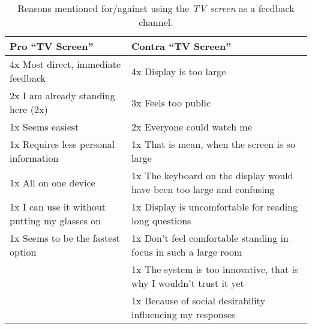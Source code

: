   \begin{table}[h]
    \small
    \center

    \begin{tabular}{p{7cm}p{7cm}}
    \toprule
    \textbf{Pro ``TV Screen''}  &  \textbf{Contra ``TV Screen''} \\ \midrule

    4x Most direct, immediate feedback  &  4x Display is too large  \\
    2x I am already standing here (2x)  &  3x Feels too public  \\
    1x Seems easiest  &  2x Everyone could watch me  \\
    1x Requires less personal information  &  1x That is mean, when the screen is so large  \\
    1x All on one device  &  1x The keyboard on the display would have been too large and confusing  \\
    1x I can use it without putting my glasses on  &  1x Display is uncomfortable for reading long questions  \\
    1x Seems to be the fastest option  &  1x Don't feel comfortable standing in focus in such a large room  \\

      &  1x The system is too innovative, that is why I wouldn't trust it yet \\
      &  1x Because of social desirability influencing my responses  \\

    \bottomrule
    \end{tabular}

    \caption[Feedback Channel - TV Screen]{Reasons mentioned for/against using the \textit{TV screen} as a feedback channel.}
    \label{table:feedback-channel-TV-screen}
  \end{table}




